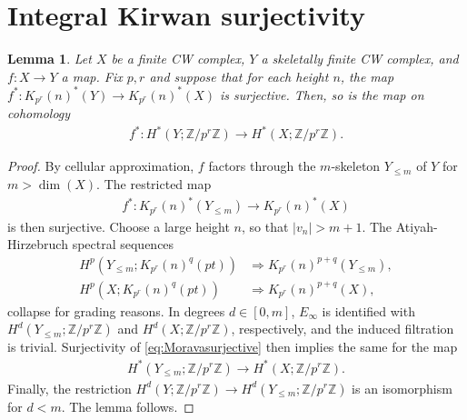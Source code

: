 \documentclass[11pt, reqno]{amsart}
\theoremstyle{plain}
\newtheorem{lem}[thm]{Lemma}
\theoremstyle{definition}
\begin{document}
\section{Integral Kirwan surjectivity}
\label{sec:integralcohomologyKir}

\begin{lem} \label{lem:truncation} Let $X$ be a finite CW complex,  $Y$ a skeletally finite CW complex, 
and $f:X \to Y$ a map.  Fix $p,r$ and suppose that for each height $n$,  
the map $f^*: K_{p^r}(n)^*(Y) \to  K_{p^r}(n)^*(X)$ is surjective.  Then, so is the map on cohomology 
\begin{align} \label{eq:surjective} 
f^*: H^*(Y; \mathbb{Z}/p^r \mathbb{Z}) \to H^*(X; \mathbb{Z}/p^r \mathbb{Z}). 
\end{align}
\end{lem} 
\begin{proof} By cellular approximation,   $f$ factors through the $m$-skeleton 
$Y_{\leq m}$ of $Y$ for $m> \operatorname{dim}(X)$. The restricted map  
\begin{align} \label{eq:Moravasurjective} 
f^*: K_{p^{r}}(n)^* (Y_{\leq m}) \to K_{p^{r}}(n)^* (X) 
\end{align} 
is then surjective.  Choose a large height $n$, so that  $|v_n|>m+1$. The Atiyah-Hirzebruch spectral sequences 
\begin{align} 
H^p(Y_{\leq m}; K_{p^{r}}(n)^{q}(pt)) &\Rightarrow K_{p^{r}}(n)^{p+q} (Y_{\leq m}), \\ 
\nonumber H^p(X; K_{p^{r}}(n)^{q}(pt)) &\Rightarrow K_{p^r}(n)^{p+q} (X), 
\end{align} 
collapse for grading reasons.  In degrees $d \in [0,m]$, $E_\infty$ is identified with $H^d(Y_{\leq m}; 
\mathbb{Z}/p^r \mathbb{Z})$ and $H^d(X; \mathbb{Z}/p^r \mathbb{Z})$, respectively, and the induced filtration 
is trivial.  Surjectivity of \eqref{eq:Moravasurjective} then
implies the same for the map 
\begin{align} \label{eq:kequalsh}
H^*(Y_{\leq m}; \mathbb{Z}/p^r \mathbb{Z}) \to H^*(X; \mathbb{Z}/p^r \mathbb{Z}). 
\end{align} 
Finally, the restriction $H^d(Y; \mathbb{Z}/p^r \mathbb{Z}) \to H^d(Y_{\leq m}; \mathbb{Z}/p^r \mathbb{Z})$ is an isomorphism for  $d <m$.  The lemma follows.     
\end{proof}
\end{document}
